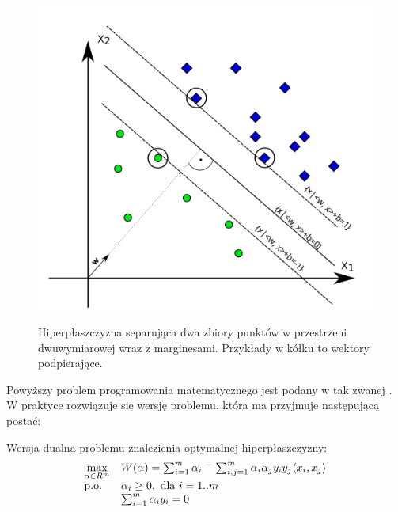 \begin{figure}[h]
\centering
\includegraphics[scale=0.5]{figures/functions/2-margin}
\label{fig:margin}
\caption{Hiperpłaszczyzna separująca dwa zbiory punktów w przestrzeni dwuwymiarowej wraz z marginesami. Przykłady w kółku to wektory podpierające.}
\end{figure}


Powyższy problem programowania matematycznego jest podany w tak zwanej . W praktyce rozwiązuje się wersję  problemu, która ma przyjmuje następującą postać:

\begin{definicjaa} Wersja dualna problemu znalezienia optymalnej hiperpłaszczyzny:
\begin{equation}
\begin{array}{ll}
\max\limits_{\alpha \in R^m} & W(\alpha) = \sum_{i=1}^{m} \alpha_i - \sum_{i,j=1}^{m} \alpha_i \alpha_j y_i y_j \langle x_i, x_j \rangle \\
\text{p.o.} &  \alpha_i \geq 0 , \text{ dla } i=1..m \\
& \sum_{i=1}^{m} \alpha_i y_i = 0
\end{array}
\label{eq:dual}
\end{equation}
\end{definicjaa}


